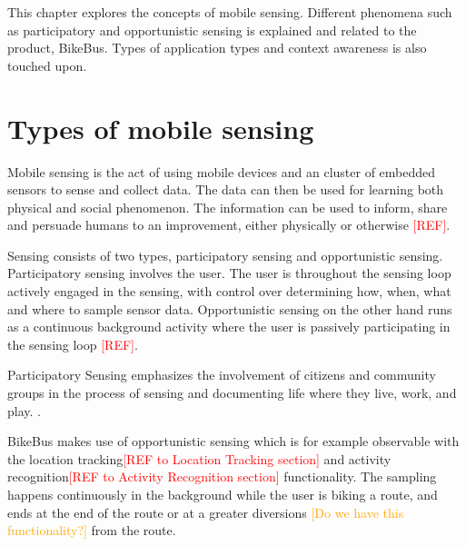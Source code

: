 
\label{section:Mobile_Sensing}

This chapter explores the concepts of mobile sensing. Different phenomena such as participatory and opportunistic sensing is explained and related to the product, BikeBus. Types of application types and context awareness is also touched upon.

\section{Types of mobile sensing}  
\label{section:Mobile_Sensing_Types_of_mobile_sensing}
Mobile sensing is the act of using mobile devices and an cluster of embedded sensors to sense and collect data. The data can then be used for learning both physical and social phenomenon. The information can be used to inform, share and persuade humans to an improvement, either physically or otherwise \textcolor{red}{[REF]}. 


Sensing consists of two types, participatory sensing and opportunistic sensing. Participatory sensing involves the user. The user is throughout the sensing loop actively engaged in the sensing, with control over determining how, when, what and where to sample sensor data. Opportunistic sensing on the other hand runs as a continuous background activity where the user is passively participating in the sensing loop \textcolor{red}{[REF]}.

\begin{defi}
Participatory  Sensing  emphasizes  the  involvement  of  citizens  and  community  groups  in  the 
process  of  sensing  and  documenting  life  where  they  live,  work,  and  play. \cite{Goldman2009}. 
\end{defi}

BikeBus makes use of opportunistic sensing which is for example observable with the location tracking\textcolor{red}{[REF to Location Tracking section]} and activity recognition\textcolor{red}{[REF to Activity Recognition section]} functionality. The sampling happens continuously in the background while the user is biking a route, and ends at the end of the route or at a greater diversions \textcolor{orange}{[Do we have this functionality?]} from the route. 




